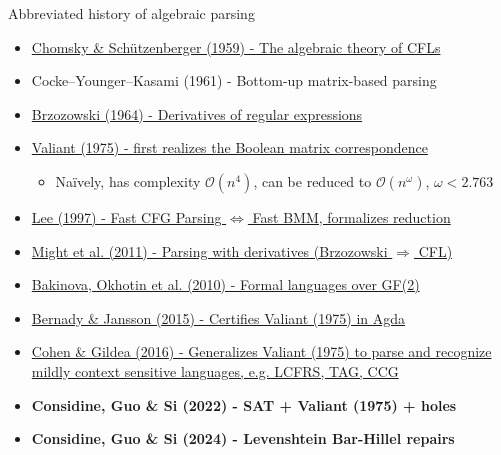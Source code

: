 \documentclass{beamer}
\begin{document}
\begin{frame}{Abbreviated history of algebraic parsing}
  \begin{itemize}
    \item \href{http://www-igm.univ-mlv.fr/~berstel/Mps/Travaux/A/1963-7ChomskyAlgebraic.pdf}{Chomsky \& Sch\"utzenberger (1959) - The algebraic theory of CFLs}
    \item Cocke–Younger–Kasami (1961) - Bottom-up matrix-based parsing
    \item \href{https://dl.acm.org/doi/10.1145/321239.321249}{Brzozowski (1964) - Derivatives of regular expressions}
    \item \href{http://theory.stanford.edu/~virgi/cs367/papers/valiantcfg.pdf}{Valiant (1975) - first realizes the Boolean matrix correspondence}
    \begin{itemize}
      \item Na\"ively, has complexity $\mathcal{O}(n^4)$, can be reduced to $\mathcal{O}(n^\omega)$, $\omega < 2.763$
    \end{itemize}
    \item \href{https://www.cs.cornell.edu/home/llee/papers/bmmcfl-jacm.pdf}{Lee (1997) - Fast CFG Parsing $\Longleftrightarrow$ Fast BMM, formalizes reduction}
    \item \href{https://matt.might.net/papers/might2011derivatives.pdf}{Might et al. (2011) - Parsing with derivatives (Brzozowski $\Rightarrow$ CFL)}
    \item \href{https://users.math-cs.spbu.ru/~okhotin/papers/formal_languages_gf2.pdf}{Bakinova, Okhotin et al. (2010) - Formal languages over GF(2)}
    \item \href{https://arxiv.org/pdf/1601.07724.pdf}{Bernady \& Jansson (2015) - Certifies Valiant (1975) in Agda}
    \item \href{https://arxiv.org/pdf/1504.08342.pdf}{Cohen \& Gildea (2016) - Generalizes Valiant (1975) to parse and recognize mildly context sensitive languages, e.g. LCFRS, TAG, CCG}
    \item \textbf{Considine, Guo \& Si (2022) - SAT + Valiant (1975) + holes}
    \item \textbf{Considine, Guo \& Si (2024) - Levenshtein Bar-Hillel repairs}
  \end{itemize}
\end{frame}
\end{document}
